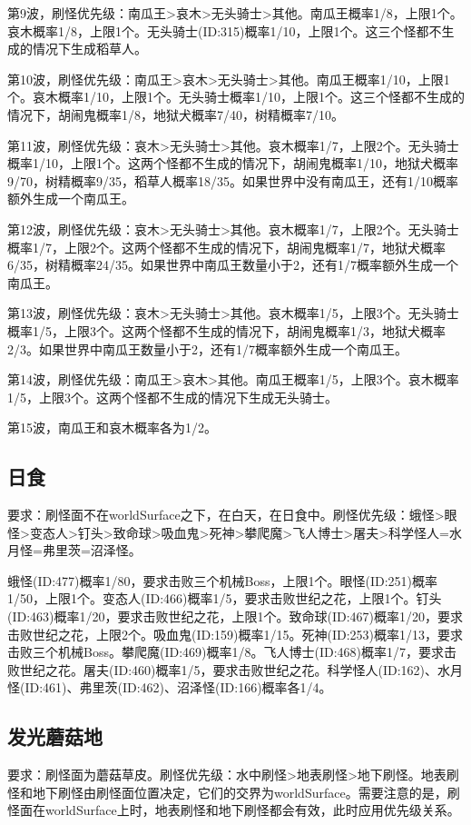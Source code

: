 第9波，刷怪优先级：南瓜王>哀木>无头骑士>其他。南瓜王概率1/8，上限1个。哀木概率1/8，上限1个。无头骑士(ID:315)概率1/10，上限1个。这三个怪都不生成的情况下生成稻草人。

第10波，刷怪优先级：南瓜王>哀木>无头骑士>其他。南瓜王概率1/10，上限1个。哀木概率1/10，上限1个。无头骑士概率1/10，上限1个。这三个怪都不生成的情况下，胡闹鬼概率1/8，地狱犬概率7/40，树精概率7/10。

第11波，刷怪优先级：哀木>无头骑士>其他。哀木概率1/7，上限2个。无头骑士概率1/10，上限1个。这两个怪都不生成的情况下，胡闹鬼概率1/10，地狱犬概率9/70，树精概率9/35，稻草人概率18/35。如果世界中没有南瓜王，还有1/10概率额外生成一个南瓜王。

第12波，刷怪优先级：哀木>无头骑士>其他。哀木概率1/7，上限2个。无头骑士概率1/7，上限2个。这两个怪都不生成的情况下，胡闹鬼概率1/7，地狱犬概率6/35，树精概率24/35。如果世界中南瓜王数量小于2，还有1/7概率额外生成一个南瓜王。

第13波，刷怪优先级：哀木>无头骑士>其他。哀木概率1/5，上限3个。无头骑士概率1/5，上限3个。这两个怪都不生成的情况下，胡闹鬼概率1/3，地狱犬概率2/3。如果世界中南瓜王数量小于2，还有1/7概率额外生成一个南瓜王。

第14波，刷怪优先级：南瓜王>哀木>其他。南瓜王概率1/5，上限3个。哀木概率1/5，上限3个。这两个怪都不生成的情况下生成无头骑士。

第15波，南瓜王和哀木概率各为1/2。

\subsection{日食}
要求：刷怪面不在worldSurface之下，在白天，在日食中。刷怪优先级：蛾怪>眼怪>变态人>钉头>致命球>吸血鬼>死神>攀爬魔>飞人博士>屠夫>科学怪人=水月怪=弗里茨=沼泽怪。

蛾怪(ID:477)概率1/80，要求击败三个机械Boss，上限1个。眼怪(ID:251)概率1/50，上限1个。变态人(ID:466)概率1/5，要求击败世纪之花，上限1个。钉头(ID:463)概率1/20，要求击败世纪之花，上限1个。致命球(ID:467)概率1/20，要求击败世纪之花，上限2个。吸血鬼(ID:159)概率1/15。死神(ID:253)概率1/13，要求击败三个机械Boss。攀爬魔(ID:469)概率1/8。飞人博士(ID:468)概率1/7，要求击败世纪之花。屠夫(ID:460)概率1/5，要求击败世纪之花。科学怪人(ID:162)、水月怪(ID:461)、弗里茨(ID:462)、沼泽怪(ID:166)概率各1/4。

\subsection{发光蘑菇地}
要求：刷怪面为蘑菇草皮。刷怪优先级：水中刷怪>地表刷怪>地下刷怪。地表刷怪和地下刷怪由刷怪面位置决定，它们的交界为worldSurface。需要注意的是，刷怪面在worldSurface上时，地表刷怪和地下刷怪都会有效，此时应用优先级关系。

